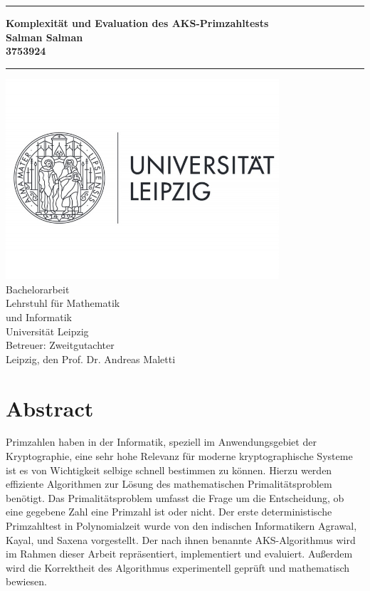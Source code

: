 \documentclass[12pt,oneside]{article}
\theoremstyle{remark}
\theoremstyle{definition}
\newcommand{\JMUTitle}[9]{

  \thispagestyle{empty}
  \vspace*{\stretch{1}}
  {\parindent0cm
  \rule{\linewidth}{.7ex}}
  \begin{flushright}
    \vspace*{\stretch{1}}
    \sffamily\bfseries\Huge
    #1\\
    \vspace*{\stretch{1}}
    \sffamily\bfseries\large
    #2\\
    \vspace*{\stretch{1}}
    \sffamily\bfseries\small
    #3
  \end{flushright}
  \rule{\linewidth}{.7ex}

  \vspace*{\stretch{1}}
  \begin{center}
    \includegraphics[width=4in]{logo} \\
    \vspace*{\stretch{1}}
    \Large  Bachelorarbeit   \\

    \vspace*{\stretch{2}}
   \large Lehrstuhl für Mathematik \\
    \large und Informatik \\
    \large Universität Leipzig\\
    \vspace*{\stretch{1}}
    \large Betreuer:  #8 \\[1mm]
    
    \vspace*{\stretch{1}}
    \large Leipzig, den #7
  \end{center}
}
\begin{document}
  \JMUTitle
      {Komplexität und Evaluation des AKS-Primzahltests  }  
      {Salman Salman}                        
      {3753924}
      
      {Fakultät für Informatik und Mathematik}  %
      {Leipzig 2020}                          %
      {\today}                              %
      {Prof. Dr. Andreas Maletti}               %
      {Zweitgutachter}                          %
      
  \clearpage

\lhead{}
    \setcounter{page}{1}

\tableofcontents
\clearpage

\listoffigures

\listoftables
\clearpage

\setlength{\parskip}{0.5em} 


\section*{Abstract}
Primzahlen haben in der Informatik, speziell im Anwendungsgebiet der Kryptographie, eine sehr hohe Relevanz für moderne kryptographische Systeme ist es von Wichtigkeit selbige schnell bestimmen zu können. Hierzu werden effiziente Algorithmen zur Lösung des mathematischen Primalitätsproblem benötigt. Das Primalitätsproblem umfasst die Frage um die Entscheidung, ob eine gegebene Zahl eine Primzahl ist oder nicht. Der erste deterministische Primzahltest in Polynomialzeit wurde von den indischen Informatikern Agrawal, Kayal, und Saxena vorgestellt. Der nach ihnen benannte AKS-Algorithmus wird im Rahmen dieser Arbeit repräsentiert, implementiert und evaluiert. Außerdem wird die Korrektheit des Algorithmus experimentell geprüft und mathematisch bewiesen. 


\clearpage
{}  
    \setcounter{page}{1}
\lhead{\nouppercase{\leftmark}}

\end{document}
